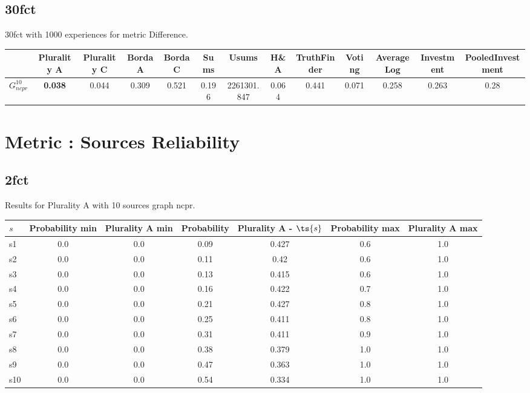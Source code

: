 \documentclass{article}
\newcommand{\graph}[2]{$G_{#1}^{#2}$}
\begin{document}
\subsection{30fct}

30fct with 1000 experiences for metric Difference.

\noindent\begin{tabular}{|l|c|c|c|c|c|c|c|c|c|c|c|c|}
\hline
& Plurality A& Plurality C& Borda A& Borda C& Sums& Usums& H\&A& TruthFinder& Voting& AverageLog& Investment& PooledInvestment\\
\hline
\graph{ncpr}{10} &\textbf{0.038}&0.044&0.309&0.521&0.196&2261301.847&0.064&0.441&0.071&0.258&0.263&0.28\\
\hline
\end{tabular}
\newpage
\newpage
\section{Metric : Sources Reliability}

\newpage
\newpage

\subsection{2fct}

\noindent Results for Plurality A with 10 sources graph ncpr.

\noindent\begin{tabular}{|l|c|c|c|c|c|c|}
\hline
$s$& Probability min & Plurality A min & Probability & Plurality A - $\ts{s}$ & Probability max & Plurality A max\\
\hline
s1 &0.0 & 0.0 & 0.09 & 0.427 & 0.6 & 1.0\\
\hline
s2 &0.0 & 0.0 & 0.11 & 0.42 & 0.6 & 1.0\\
\hline
s3 &0.0 & 0.0 & 0.13 & 0.415 & 0.6 & 1.0\\
\hline
s4 &0.0 & 0.0 & 0.16 & 0.422 & 0.7 & 1.0\\
\hline
s5 &0.0 & 0.0 & 0.21 & 0.427 & 0.8 & 1.0\\
\hline
s6 &0.0 & 0.0 & 0.25 & 0.411 & 0.8 & 1.0\\
\hline
s7 &0.0 & 0.0 & 0.31 & 0.411 & 0.9 & 1.0\\
\hline
s8 &0.0 & 0.0 & 0.38 & 0.379 & 1.0 & 1.0\\
\hline
s9 &0.0 & 0.0 & 0.47 & 0.363 & 1.0 & 1.0\\
\hline
s10 &0.0 & 0.0 & 0.54 & 0.334 & 1.0 & 1.0\\
\hline
\end{tabular}\\
\end{document}

